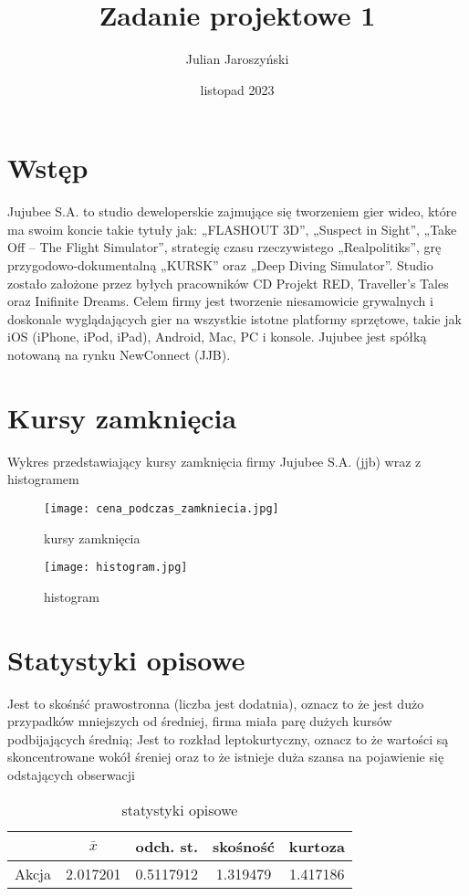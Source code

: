 \documentclass{article}
\title{Zadanie projektowe 1}
\author{Julian Jaroszyński}
\date{listopad 2023}
\begin{document}
\maketitle
\tableofcontents

\newpage
\section*{Wstęp}
	Jujubee S.A. to studio deweloperskie zajmujące
	się tworzeniem gier wideo, które ma swoim koncie
	takie tytuły jak: „FLASHOUT 3D”, „Suspect in
	Sight”, „Take Off – The Flight Simulator”,
	strategię czasu rzeczywistego „Realpolitiks”, grę
	przygodowo-dokumentalną „KURSK” oraz „Deep Diving
	Simulator”. Studio zostało założone przez byłych
	pracowników CD Projekt RED, Traveller’s Tales oraz
	Inifinite Dreams. Celem firmy jest tworzenie niesamowicie
	grywalnych i doskonale wyglądających gier na wszystkie
	istotne platformy sprzętowe, takie jak iOS (iPhone,
	iPod, iPad), Android, Mac, PC i konsole. Jujubee jest
	spółką notowaną na rynku NewConnect (JJB).
\newpage
\section{Kursy zamknięcia}
	Wykres przedstawiający kursy zamknięcia firmy Jujubee S.A. (jjb) wraz z histogramem
	\begin{figure}[H]
		\centering
		\renewcommand\figurename{Wykres}
		\texttt{[image: cena\_podczas\_zamkniecia.jpg]}
		\caption{kursy zamknięcia}
	\end{figure}
	\begin{figure}[H]
		\centering
		\renewcommand\figurename{Wykres}
		\texttt{[image: histogram.jpg]}
		\caption{histogram}
	\end{figure}
\newpage
\section{Statystyki opisowe}
	Jest to skośnść prawostronna (liczba jest dodatnia), oznacz to że jest
	dużo przypadków mniejszych od średniej, firma miała parę dużych kursów
	podbijających średnią;
	Jest to rozkład leptokurtyczny, oznacz to że wartości są skoncentrowane
	wokół śreniej oraz to że istnieje duża szansa na pojawienie się
	odstających obserwacji
	\begin{table}[h]
		\centering
		\renewcommand\tablename{Tabela}
		\begin{tabular}{|c|c|c|c|c|}
			\hline
			 & $\bar{x}$ & odch. st. & skośność & kurtoza \\
			\hline
			Akcja & 2.017201 & 0.5117912 & 1.319479 & 1.417186 \\
			\hline
		\end{tabular}
		\caption{statystyki opisowe}
		\label{tab:przyklad}
	\end{table}
\newpage
\end{document}
